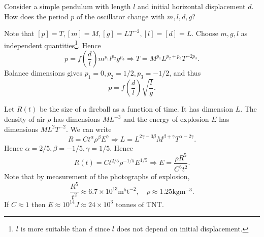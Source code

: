 \begin{example}
    Consider a simple pendulum with length $l$ and initial horizontal displacement $d$. How does the period $p$ of the oscillator change with $m,l,d,g$?
    \begin{center}
    \end{center}
    Note that $ [p]=T, [m]=M, [g]=LT^{-2}, [l]=[d]=L $. Choose $m,g,l$ as independent quantities\footnote{$l$ is more suitable than $d$ since $l$ does not depend on initial displacement.}. Hence 
    \[
        p = f\left( \frac{d}{l} \right)m^{p_1}l^{p_2}g^{p_3} \Longrightarrow T=M^{p_1}L^{p_2+p_3}T^{-2p_3}.
    \]
    Balance dimensions gives $ p_1=0, p_2= 1/2, p_3=-1/2$, and thus 
    \[
        p = f\left( \frac{d}{l} \right) \sqrt{\frac{l}{g}}.
    \]
\end{example}
\begin{example}
    Let $ R(t) $ be the size of a fireball as a function of time. It has dimension $ L $. The density of air $\rho$ has dimensions $ ML^{-3} $ and the energy of explosion $E$ has dimensions $ ML^2T^{-2} $. We can write 
    \[
        R = C t^{\alpha}\rho^{\beta}E^{\gamma}\Longrightarrow L=L^{2\gamma-3\beta}M^{\beta+\gamma}T^{\alpha-2\gamma}.
    \]
    Hence $ \alpha=2/5 , \beta=-1/5,\gamma=1/5 $. Hence
    \[
        R(t)=C t^{2/5}\rho^{-1/5}E^{1/5} \Longrightarrow E = \frac{\rho R^5}{C^5 t^2}.
    \]
    Note that by measurement of the photographs of explosion,
    \[
        \frac{R^5}{t^2} \approx 6.7 \times 10^{13} \mathrm{m}^5 \mathrm{t}^{-2},\quad \rho \approx 1.25 \mathrm{kg} \mathrm{m}^{-3}.
    \]
    If $C\approx 1$ then $ E \approx 10^{14}J \approx 24 \times 10^{3} \text{ tonnes of TNT} $.
\end{example}